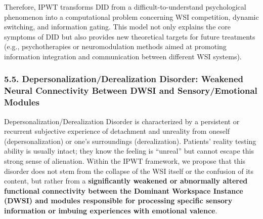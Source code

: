 \documentclass[
  a4paper]{article}
\begin{document}
Therefore, IPWT transforms DID from a difficult-to-understand
psychological phenomenon into a computational problem concerning WSI
competition, dynamic switching, and information gating. This model not
only explains the core symptoms of DID but also provides new theoretical
targets for future treatments (e.g., psychotherapies or neuromodulation
methods aimed at promoting information integration and communication
between different WSI systems).

\subsubsection{5.5. Depersonalization/Derealization Disorder: Weakened
Neural Connectivity Between DWSI and Sensory/Emotional
Modules}\label{depersonalizationderealization-disorder-weakened-neural-connectivity-between-dwsi-and-sensoryemotional-modules}

Depersonalization/Derealization Disorder is characterized by a
persistent or recurrent subjective experience of detachment and
unreality from oneself (depersonalization) or one's surroundings
(derealization). Patients' reality testing ability is usually intact;
they know the feeling is ``unreal'' but cannot escape this strong sense
of alienation. Within the IPWT framework, we propose that this disorder
does not stem from the collapse of the WSI itself or the confusion of
its content, but rather from a \textbf{significantly weakened or
abnormally altered functional connectivity between the Dominant
Workspace Instance (DWSI) and modules responsible for processing
specific sensory information or imbuing experiences with emotional
valence}.
\end{document}
